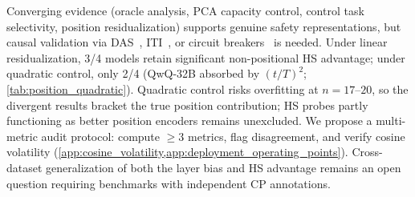 
Converging evidence (oracle analysis, PCA capacity control, control task selectivity, position residualization) supports genuine safety representations, but causal validation via DAS~\citep{geiger2025causal}, ITI~\citep{li2024iti}, or circuit breakers~\citep{zou2024improving} is needed. Under linear residualization, 3/4 models retain significant non-positional HS advantage; under quadratic control, only 2/4 (QwQ-32B absorbed by $(t/T)^2$; \cref{tab:position_quadratic}). Quadratic control risks overfitting at $n{=}17$--$20$, so the divergent results bracket the true position contribution; HS probes partly functioning as better position encoders remains unexcluded. We propose a multi-metric audit protocol: compute ${\geq}3$ metrics, flag disagreement, and verify cosine volatility (\cref{app:cosine_volatility,app:deployment_operating_points}). Cross-dataset generalization of both the layer bias and HS advantage remains an open question requiring benchmarks with independent CP annotations.


